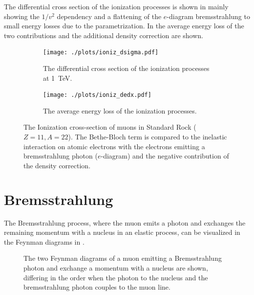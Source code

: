 The differential cross section of the ionization processes is shown in  mainly showing the $1/v^2$ dependency and a flattening of the $e$-diagram bremsstrahlung to small energy losses due to the parametrization.
In  the average energy loss of the two contributions and the additional density correction are shown.
\begin{figure}
    \centering
    \begin{subfigure}{0.9\textwidth}
        \centering
        \texttt{[image: ./plots/ioniz\_dsigma.pdf]}
        \caption{The differential cross section of the ionization processes at \SI{1}{TeV}.}
        \label{fig:ioniz_dsigma}
        \vspace{0.5cm}
    \end{subfigure}
    \begin{subfigure}{0.9\textwidth}
        \centering
        \texttt{[image: ./plots/ioniz\_dedx.pdf]}
        \caption{The average energy loss of the ionization processes.}
        \label{fig:ioniz_dedx}
    \end{subfigure}
    \caption{The Ionization cross-section of muons in Standard Rock ($Z=11, A=22$). The Bethe-Bloch term is compared to the inelastic interaction on atomic electrons with the electrons emitting a bremsstrahlung photon ($e$-diagram) and the negative contribution of the density correction.}
    \label{fig:ioniz}
\end{figure}

%
%

\section{Bremsstrahlung} \label{sec:brems}

The Bremsstrahlung process, where the muon emits a photon and exchanges the remaining momentum with a nucleus in an elastic process, can be visualized in the Feynman diagrams in .
\begin{figure}
    \centering
    
    \caption{The two Feynman diagrams of a muon emitting a Bremsstrahlung photon and exchange a momentum with a nucleus are shown, differing in the order when the photon to the nucleus and the bremsstrahlung photon couples to the muon line.}
    \label{fig:feyn_brems}
\end{figure}


